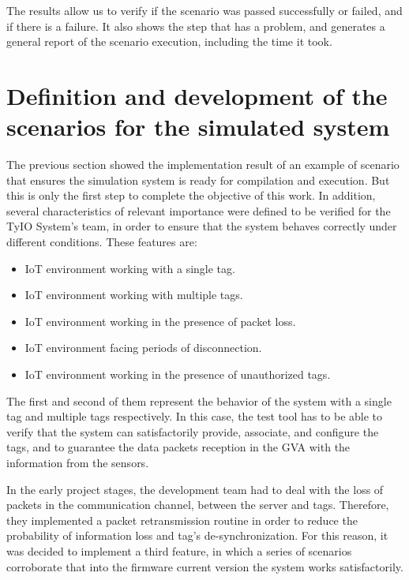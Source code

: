 \documentclass[journal]{IEEEtran}	%
\begin{document}
The results allow us to verify if the scenario was passed successfully or failed, and if there is a failure. It also shows the step that has a problem, and generates a general report of the scenario execution, including the time it took.


\section{Definition and development of the scenarios for the simulated system}


The previous section showed the implementation result of an example of scenario that ensures the simulation system is ready for compilation and execution. But this is only the first step to complete the objective of this work. In addition, several characteristics of relevant importance were defined to be verified for the TyIO System's team, in order to ensure that the system behaves correctly under different conditions. These features are:\\

\begin{itemize}
    \item IoT environment working with a single tag.
    \item IoT environment working with multiple tags.
    \item IoT environment working in the presence of packet loss.
    \item IoT environment facing periods of disconnection.
    \item IoT environment working in the presence of unauthorized tags.
\end{itemize}

The first and second of them represent the behavior of the system with a single tag and multiple tags respectively. In this case, the test tool has to be able to verify that the system can satisfactorily provide, associate, and configure the tags, and to guarantee the data packets reception in the GVA with the information from the sensors.

In the early project stages, the development team had to deal with the loss of packets in the communication channel, between  the server and tags. Therefore, they implemented a packet retransmission routine in order to reduce the probability of information loss and tag's de-synchronization. For this reason, it was decided to implement a third feature, in which a series of scenarios corroborate that into the firmware current version the system works satisfactorily.
\end{document}

